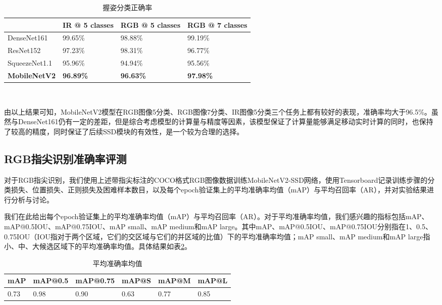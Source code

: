 \begin{table}[htbp]
\centering
\caption{握姿分类正确率}
\label{tbl:ges_class}
\begin{tabular}{p{80 pt}p{100 pt}p{100 pt}p{100 pt}}
 \toprule
   & IR @ 5 classes & RGB @ 5 classes & RGB @ 7 classes\\
 \midrule
    DenseNet161 & 99.65\% & 98.88\% & 99.19\% \\
    ResNet152 & 97.23\% & 98.31\% & 96.77\% \\
    SqueezeNet1.1 & 95.96\% & 94.94\% & 95.56\% \\
    \textbf{MobileNetV2} & \textbf{96.89\%} & \textbf{96.63\%} & \textbf{97.98\%} \\
\bottomrule
 \end{tabular}\\[2pt]
\end{table}

由以上结果可知，MobileNetV2模型在RGB图像5分类、RGB图像7分类、IR图像5分类三个任务上都有较好的表现，准确率均大于96.5\%。虽然与DenseNet161仍有一定的差距，但是综合考虑模型的计算量与精度等因素，该模型保证了计算量能够满足移动实时计算的同时，也保持了较高的精度，同时保证了后续SSD模块的有效性，是一个较为合理的选择。

\subsection{RGB指尖识别准确率评测}

对于RGB指尖识别，我们使用上述带指尖标注的COCO格式RGB图像数据训练MobileNetV2-SSD网络，使用Tensorboard记录训练步骤的分类损失、位置损失、正则损失及困难样本数目，以及每个epoch验证集上的平均准确率均值（mAP）与平均召回率（AR），并对实验结果进行分析与讨论。

我们在此给出每个epoch验证集上的平均准确率均值（mAP）与平均召回率（AR）。对于平均准确率均值，我们感兴趣的指标包括mAP、mAP@0.5IOU、mAP@0.75IOU、mAP small、mAP medium和mAP large。其中mAP、mAP@0.5IOU、mAP@0.75IOU分别指在1、0.5、0.75IOU（IOU指对于两个区域，它们的交区域与它们的并区域的比值）下的平均准确率均值；mAP small、mAP medium和mAP large指小、中、大候选区域下的平均准确率均值。具体结果如表\ref{tbl:fingertip_precision}。

\begin{table}[htbp]
\centering
\caption{平均准确率均值}
\label{tbl:fingertip_precision}
\begin{tabular}{p{60 pt}p{60 pt}p{60 pt}p{60 pt}p{60 pt}p{60 pt}}
 \toprule
  mAP & mAP@0.5 & mAP@0.75 & mAP@S & mAP@M & mAP@L\\
 \midrule
    0.73 & 0.98 & 0.90 & 0.63 & 0.77 & 0.85 \\
\bottomrule
 \end{tabular}\\[2pt]
\end{table}

